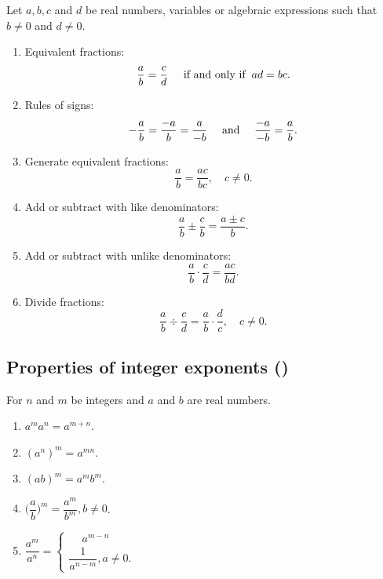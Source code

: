 \documentclass{rmutt-seminar}
\begin{document}
Let $a, b, c$ and $d$ be real numbers, variables or algebraic expressions such that $b \neq 0$ and $d \neq 0$.
\begin{enumerate} 
	\item Equivalent fractions:
	\begin{equation*}
		\frac{a}{b} = \frac{c}{d} \hspace*{0.5cm} \textnormal{if and only if} \hspace*{0.2cm} ad = bc.
	\end{equation*}
	\item Rules of signs:
	\begin{equation*}
		-\frac{a}{b} = \frac{-a}{b} = \frac{a}{-b}\quad \textnormal{ and } \quad \frac{-a}{-b} = \frac{a}{b}.
	\end{equation*}
	\item Generate equivalent fractions:
	\begin{equation*}
		\frac{a}{b} = \frac{ac}{bc}, \quad c \neq 0.
	\end{equation*}
	\item Add or subtract with like denominators: 
	\begin{equation*}
		\frac{a}{b} \pm \frac{c}{b} = \frac{a \pm c}{b}.
	\end{equation*}	
	\item Add or subtract with unlike denominators:
	\begin{equation*}
		\frac{a}{b} \cdot \frac{c}{d} = \frac{ac}{bd}.
	\end{equation*}
	\item Divide fractions:
	\begin{equation*}
		\frac{a}{b} \div \frac{c}{d} = \frac{a}{b} \cdot \frac{d}{c},\quad c \neq 0.
	\end{equation*}
\end{enumerate}

\subsection*{Properties of integer exponents (\cite{ARE08})} For $n$ and $m$ be integers and $a$ and $b$ are real numbers.
\begin{enumerate}
	\item $a^ma^n=a^{m+n}$.
	\item $(a^n)^m=a^{mn}$.
	\item $(ab)^m=a^mb^m$.
	\item $\bigg(\dfrac{a}{b}\bigg)^m =\dfrac{a^m}{b^m},b\neq0$.
	\item $\dfrac{a^m}{a^n} = \begin{cases} \phantom{-} a^{m-n}& 
			 \\ \dfrac{1}{a^{n-m}},a \neq 0. \end{cases}$\\
\end{enumerate}
\end{document}
